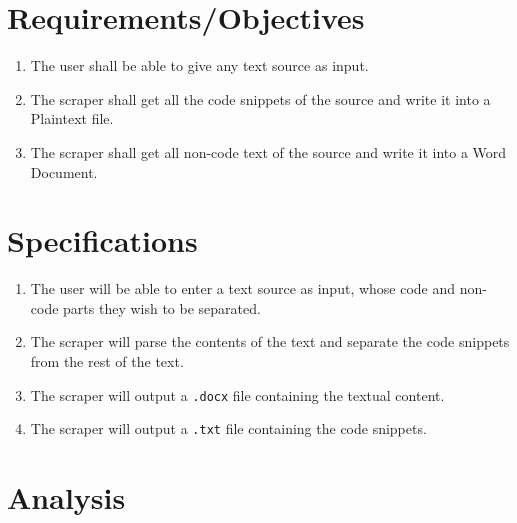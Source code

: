 \documentclass[12pt]{scrreprt}
\newcommand{\ttt}[1]{\texttt{#1}}
\begin{document}
\section{Requirements/Objectives}

\begin{enumerate}
    \item The user shall be able to give any text source as input.
    \item The scraper shall get all the code snippets of the source and write it into a Plaintext file.
    \item The scraper shall get all non-code text of the source and write it into a Word Document.
\end{enumerate}


\section{Specifications}

\begin{enumerate}
    \item The user will be able to enter a text source as input, whose code and non-code parts they wish to be separated.
    \item The scraper will parse the contents of the text and separate the code snippets from the rest of the text.
    \item The scraper will output a \texttt{.docx} file containing the textual content.
    \item The scraper will output a \ttt{.txt} file containing the code snippets.  
\end{enumerate}



\section{Analysis}
\end{document}
